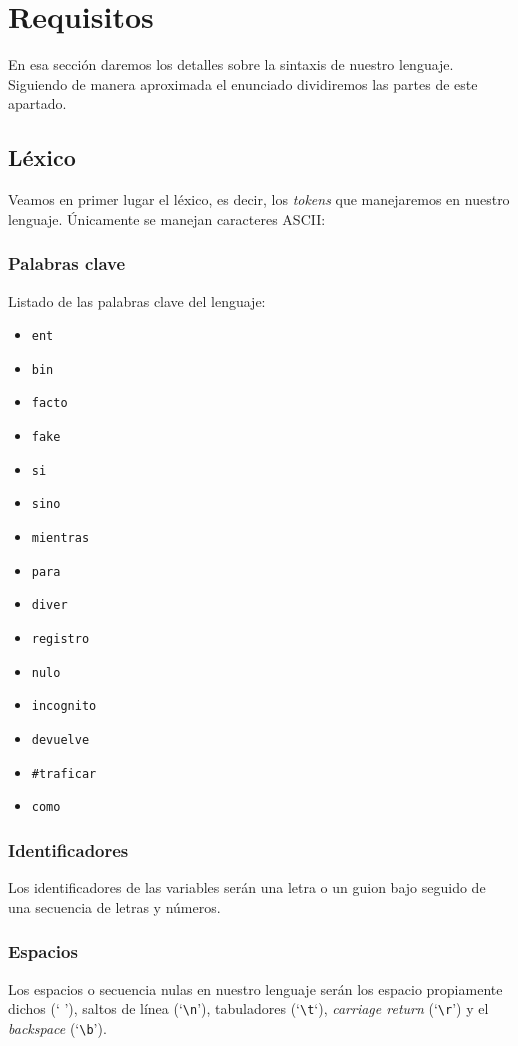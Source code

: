 \section{Requisitos}
En esa sección daremos los detalles sobre la sintaxis de nuestro lenguaje.
Siguiendo de manera aproximada el enunciado dividiremos las partes de este
apartado.

\subsection{Léxico}
Veamos en primer lugar el léxico, es decir, los \textit{tokens} que manejaremos
en nuestro lenguaje. Únicamente se manejan caracteres ASCII:
\subsubsection{Palabras clave}
Listado de las palabras clave del lenguaje:
\begin{itemize}
    \item \lstinline{ent}
    \item \lstinline{bin}
    \item \lstinline{facto}
    \item \lstinline{fake}
    \item \lstinline{si}
    \item \lstinline{sino}
    \item \lstinline{mientras}
    \item \lstinline{para}
    \item \lstinline{diver}
    \item \lstinline{registro}
    \item \lstinline{nulo}
    \item \lstinline{incognito}
    \item \lstinline{devuelve}
    \item \lstinline{#traficar}
    \item \lstinline{como}
\end{itemize}

\subsubsection{Identificadores}
Los identificadores de las variables serán una letra o un guion bajo seguido de
una secuencia de letras y números.

\subsubsection{Espacios}
Los espacios o secuencia nulas en nuestro lenguaje serán los espacio propiamente
dichos (` '), saltos de línea (`\lstinline{\n}'), tabuladores
(`\lstinline{\t}`), \textit{carriage return} (`\lstinline{\r}') y el
\textit{backspace} (`\lstinline{\b}').

